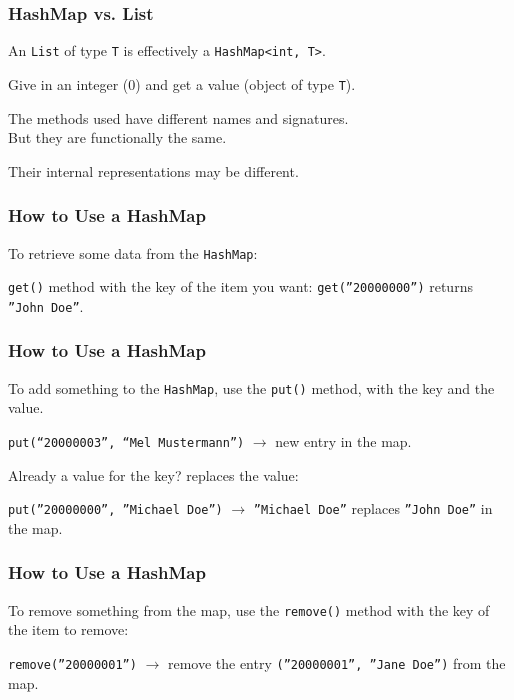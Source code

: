 \begin{frame}
\frametitle{HashMap vs. List}
\begin{changemargin}{1.5cm}

An \texttt{List} of type \texttt{T} is effectively a \texttt{HashMap<int, T>}. 

Give in an integer (0) and get a value (object of type \texttt{T}). 

The methods used have different names and signatures. \\
\quad But they are functionally the same. 

Their internal representations may be different.


\end{changemargin}
\end{frame}


\begin{frame}
\frametitle{How to Use a HashMap}
\begin{changemargin}{1.5cm}

To retrieve some data from the \texttt{HashMap}:

\texttt{get()} method with the key of the item you want: \texttt{get(''20000000'')} returns \texttt{''John Doe''}.


\end{changemargin}
\end{frame}


\begin{frame}
\frametitle{How to Use a HashMap}
\begin{changemargin}{1.5cm}


To add something to the \texttt{HashMap}, use the \texttt{put()} method, with the key and the value.

\texttt{put(``20000003'', ``Mel Mustermann'')} $\rightarrow$ new entry in the map. 

Already a value for the key? replaces the value: 

\texttt{put(''20000000'', ''Michael Doe'')} $\rightarrow$ \texttt{''Michael Doe''} replaces \texttt{''John Doe''} in the map.


\end{changemargin}
\end{frame}

\begin{frame}
\frametitle{How to Use a HashMap}
\begin{changemargin}{1.5cm}


To remove something from the map, use the \texttt{remove()} method with the key of the item to remove: 

\texttt{remove(''20000001'')} $\rightarrow$ remove the entry \texttt{(''20000001'', ''Jane Doe'')} from the map.

\end{changemargin}
\end{frame}


